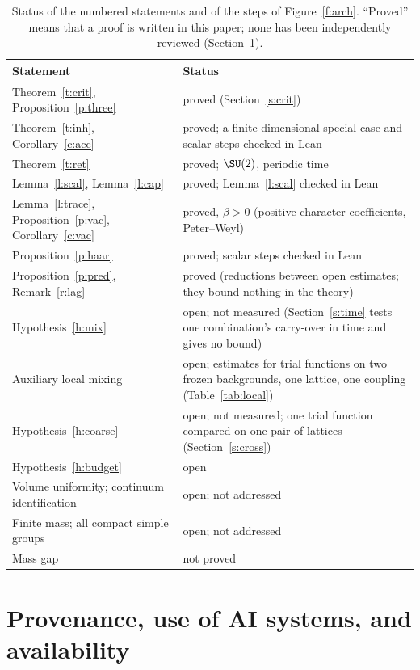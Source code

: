 \begin{table}[ht]
\centering\small
\begin{tabular}{@{}>{\raggedright\arraybackslash}p{}>{\raggedright\arraybackslash}p{}@{}}
\toprule
Statement & Status \\
\midrule
Theorem~\ref{t:crit}, Proposition~\ref{p:three} & proved (Section~\ref{s:crit}) \\
Theorem~\ref{t:inh}, Corollary~\ref{c:acc} & proved; a finite-dimensional special case and scalar steps checked in Lean \\
Theorem~\ref{t:ret} & proved; $\SU(2)$, periodic time \\
Lemma~\ref{l:scal}, Lemma~\ref{l:cap} & proved; Lemma~\ref{l:scal} checked in Lean \\
Lemma~\ref{l:trace}, Proposition~\ref{p:vac}, Corollary~\ref{c:vac} & proved, $\beta>0$ (positive character coefficients, Peter--Weyl) \\
Proposition~\ref{p:haar} & proved; scalar steps checked in Lean \\
Proposition~\ref{p:pred}, Remark~\ref{r:lag} & proved (reductions between open estimates; they bound nothing in the theory) \\
Hypothesis~\ref{h:mix} & open; not measured (Section~\ref{s:time} tests one combination's carry-over in time and gives no bound) \\
Auxiliary local mixing & open; estimates for trial functions on two frozen backgrounds, one lattice, one coupling (Table~\ref{tab:local}) \\
Hypothesis~\ref{h:coarse} & open; not measured; one trial function compared on one pair of lattices (Section~\ref{s:cross}) \\
Hypothesis~\ref{h:budget} & open \\
Volume uniformity; continuum identification & open; not addressed \\
Finite mass; all compact simple groups & open; not addressed \\
Mass gap & not proved \\
\bottomrule
\end{tabular}
\caption{Status of the numbered statements and of the steps of Figure~\ref{f:arch}. ``Proved'' means that a
proof is written in this paper; none has been independently reviewed (Section~\ref{s:disc}).}\label{tab:status}
\end{table}

\section{Provenance, use of AI systems, and availability}\label{s:disc}
